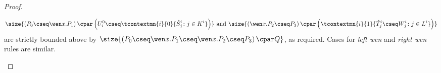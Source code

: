 \begin{proof}
\begin{enumerate}[label=\textbf{\Alph*},ref=\Alph*,leftmargin=*]
\begin{enumerate}[label*=\textbf{.\arabic*}]
\[
\size{
\left( P_0 \cseq \wen x. P_1\right) \cpar
\left(
    U^0_i \cseq
    \tcontextmn{i}{0}{
         \hat{S}^i_j 
         \colon j \in K^i
    }
\right)
}
\mbox{ and }
\size {
\left( \wen x. P_2  \cseq P_3 \right) \cpar
\left(
\tcontextmn{i}{1}{
    \hat{T}^i_j \cseq 
    W^i_j \colon j \in L^i
}\right)
}
\]
are strictly bounded above by 
$\size{ \left(P_0\cseq \wen x. P_1\cseq \wen x. P_2  \cseq P_3 \right) \cpar Q }$, as required.
Cases for \textit{left wen} and \textit{right wen} rules are similar.
\begin{comment}
There are three similar principal case for \textit{seq} that do not correspond to cases in \textsf{MAV}~\cite{Horne2015}, induced by the \textit{suspend}, \textit{left wen} and \textit{right wen} rules.
We present here only the case induced by \textit{suspend}.
Consider the case where the bottommost rule of a proof is a \textit{suspend} rule that interferes with the \textit{seq} connective to which splitting is applied as follows.
\[
\left(P_0\cseq \wen x P_1\cseq \wen x P_2  \cseq P_3 \right) \cpar T
\longrightarrow
\left(P_0\cseq \wen x \left( P_1\cseq P_2  \right) \cseq P_3 \right) \cpar T
\]
In the above, it is assumed that $\vdash \left(P_0\cseq \wen x \left( P_1\cseq P_2  \right) \cseq P_3 \right) \cpar T$ and also $\nfv{x}{P}$, $\nfv{x}{S}$ and $\nfv{x}{T}$.
Hence, by induction, there exist $U^0_i$ and $U^1_i$ such that $\vdash P_0\cpar U^0_i$ and $\vdash \left( \wen x \left( P_1\cseq P_2  \right) \cseq P_3 \right) \cpar U^1_i$, for $1 \leq i \leq n$,
and $n$-ary killing context $\tcontext{}$ such that the following derivation holds.
$
T \longrightarrow \tcontext{ U^0_i \cseq U^1_i \colon 1 \leq i \leq n }
$.
Furthermore the size of the proof of $\left( \wen x \left( P_1\cseq P_2  \right) \cseq P_3 \right) \cpar U^1_i$ is bounded by the size of the proof of $\left(P_0\cseq \wen x P_1\cseq \wen x P_2  \cseq P_3 \right) \cpar T$.

By induction again, there exist $V^i_j$ and $W^i_j$ such that $\vdash \wen x \left( P_1\cseq P_2  \right) \cpar V^i_k$ and $\vdash P_3 \cpar W^i_j$, for $1 \leq j \leq m_i$, and $m_i$-ary killing context $\tcontextn{i}{}$ such that the following derivation holds.
$
U^1_i
\longrightarrow
\tcontextn{i}{ V^i_j \cseq W^i_j \colon 1 \leq j \leq m_i }
$.
Furthermore, the size of the proof of $\wen x \left( P_1\cseq P_2  \right) \cpar V^i_k$ is bounded by the size of the proof of $\left( \wen x \left( P_1\cseq P_2  \right) \cseq P_3 \right) \cpar U^1_i$. 


\end{comment}
\end{enumerate}
\end{enumerate}
\end{proof}
